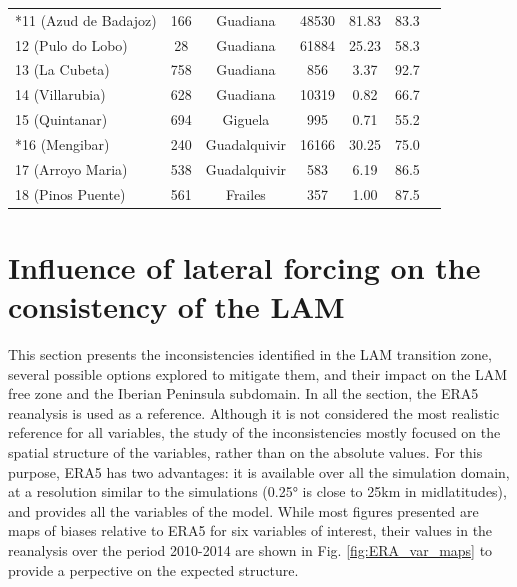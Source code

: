 \begin{table}[htbp]
{\begin{tabular}{lcccccc}
        *11 (Azud de Badajoz)   & 166   & Guadiana  & 48530     & 81.83  & 83.3 \\
        12 (Pulo do Lobo)       & 28    & Guadiana  & 61884     & 25.23  & 58.3 \\
        13 (La Cubeta)          & 758   & Guadiana  & 856       & 3.37   & 92.7 \\
        14 (Villarubia)         & 628   & Guadiana  & 10319     & 0.82   & 66.7 \\
        15 (Quintanar)          & 694   & Giguela   & 995       & 0.71   & 55.2 \\
        *16 (Mengibar)          & 240   & Guadalquivir & 16166  & 30.25  & 75.0 \\
        17 (Arroyo Maria)       & 538   & Guadalquivir & 583    & 6.19   & 86.5 \\
        18 (Pinos Puente)       & 561   & Frailes   & 357       & 1.00   & 87.5 \\
        \bottomrule
    \end{tabular}
    }
    \label{table:stations_data}
\end{table}

\clearpage

\section{Influence of lateral forcing on the consistency of the LAM}
\label{sec:forcing_influence}

This section presents the inconsistencies identified in the LAM transition zone, several possible options explored to mitigate them, and their impact on the LAM free zone and the Iberian Peninsula subdomain. In all the section, the ERA5 reanalysis is used as a reference. Although it is not considered the most realistic reference for all variables, the study of the inconsistencies mostly focused on the spatial structure of the variables, rather than on the absolute values.
For this purpose, ERA5 has two advantages: it is available over all the simulation domain, at a resolution similar to the simulations (0.25° is close to 25km in midlatitudes), and provides all the variables of the model.
While most figures presented are maps of biases relative to ERA5 for six variables of interest, their values in the reanalysis over the period 2010-2014 are shown in Fig. \ref{fig:ERA_var_maps} to provide a perpective on the expected structure.

